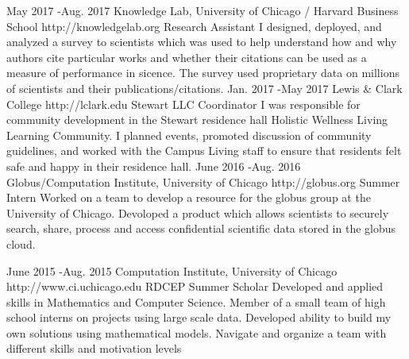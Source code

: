 \documentclass[10pt]{article} %
\begin{document}
\job
{May 2017 -}{Aug. 2017}
{Knowledge Lab, University of Chicago / Harvard Business School}
{http://knowledgelab.org}
{Research Assistant}
{I designed, deployed, and analyzed a survey to scientists which was used to help understand how and why authors cite particular works and whether their citations can be used as a measure of performance in sicence. The survey used proprietary data on millions of scientists and their publications/citations.}
\job
{Jan. 2017 -}{May 2017}
{Lewis \& Clark College}
{http://lclark.edu}
{Stewart LLC Coordinator}
{I was responsible for community development in the Stewart residence hall Holistic Wellness Living Learning Community. I planned events, promoted discussion of community guidelines, and worked with the Campus Living staff to ensure that residents felt safe and happy in their residence hall.}
\job
{June 2016 -}{Aug. 2016}
{Globus/Computation Institute, University of Chicago}
{http://globus.org}
{Summer Intern}
{Worked on a team to develop a resource for the globus group at the University of Chicago. Devoloped a product which allows scientists to securely search, share, process and access confidential scientific data stored in the globus cloud.}

\job
{June 2015 -}{Aug. 2015}
{Computation Institute, University of Chicago}
{http://www.ci.uchicago.edu}
{RDCEP Summer Scholar}
{Developed and applied skills in Mathematics and Computer Science. Member of a small team of high school interns on projects using large scale data.   Developed ability to build my own solutions using mathematical models.  Navigate and organize a team with different skills and motivation levels}




\end{document}
